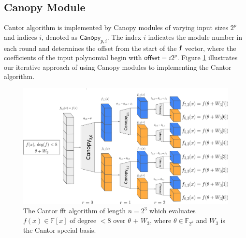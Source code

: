 \subsection{Canopy Module} \label{sec:Canopy}
Cantor algorithm is implemented by Canopy modules of varying input sizes $2^p$ and indices $i$, denoted as $\mathsf{Canopy}_{p, i}$. The index $i$ indicates the module number in each round and determines the offset from the start of the ${\bf{f}}$ vector, where the coefficients of the input polynomial begin with $\mathsf{offset} = i2^p$. Figure \ref{fig:Canopy} illustrates our iterative approach of using Canopy modules to implementing the Cantor algorithm.


 \begin{figure}
	     \centering
	     \includegraphics[width=\linewidth]{Figures/Canopy.jpg}
	     \caption[The Canopy module in the Cantor FFT algorithm]{The Cantor \gls{fft} algorithm of length $n = 2^3$ which evaluates $f(x)\in\mathbb{F}[x]$ of degree $<8$ over $\theta$ + $W_3$, where $\theta \in \mathbb{F}_{2^k}$ and $W_3$ is the Cantor special basis.}
	     \label{fig:Canopy}
	 \end{figure}%

